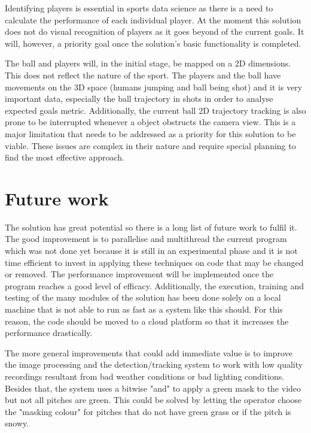 \documentclass[
    11pt,
    oneside
]{report}
\begin{document}
Identifying players is essential in sports data science as there is a need to calculate the performance of each individual player. At the moment this solution does not do visual recognition of players as it goes beyond of the current goals. It will, however, a priority goal once the solution's basic functionality is completed.


The ball and players will, in the initial stage, be mapped on a 2D dimensions. This does not reflect the nature of the sport. The players and the ball have movements on the 3D space (humans jumping and ball being shot) and it is very important data, especially the ball trajectory in shots in order to analyse expected goals metric. Additionally, the current ball 2D trajectory tracking is also prone to be interrupted whenever a object obstructs the camera view. This is a major limitation that needs to be addressed as a priority for this solution to be viable. These issues are complex in their nature and require special planning to find the most effective approach.




\section{Future work}




The solution has great potential so there is a long list of future work to fulfil it. The good improvement is to parallelise and multithread the current program which was not done yet because it is still in an experimental phase and it is not time efficient to invest in applying these techniques on code that may be changed or removed. The performance improvement will be implemented once the program reaches a good level of efficacy. Additionally, the execution, training and testing of the many modules of the solution has been done solely on a local machine that is not able to run as fast as a system like this should. For this reason, the code should be moved to a cloud platform so that it increases the performance drastically.


The more general improvements that could add immediate value is to improve the image processing and the detection/tracking system to work with low quality recordings resultant from bad weather conditions or bad lighting conditions. Besides that, the system uses a bitwise "and" to apply a green mask to the video but not all pitches are green. This could be solved by letting the operator choose the "masking colour" for pitches that do not have green grass or if the pitch is snowy.
\end{document}
